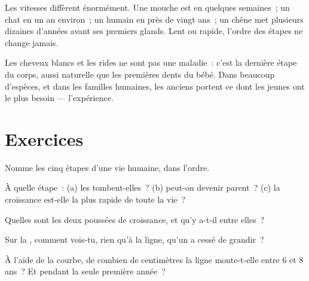 \begin{example}\label{ex:g3:stages-of-life:speeds}
Les vitesses diffèrent énormément. Une mouche est  en quelques
semaines~; un chat en un an environ~; un humain en près de vingt
ans~; un chêne met plusieurs dizaines d'années avant ses premiers
glands. Lent ou rapide, l'ordre des étapes ne change jamais.
\end{example}

\begin{remark}\label{rem:g3:stages-of-life:oldage}
Les cheveux blancs et les rides ne sont pas une maladie~: c'est la
dernière étape du corps, aussi naturelle que les premières dents du
bébé. Dans beaucoup d'espèces, et dans les familles humaines, les
anciens portent ce dont les jeunes ont le plus besoin ---
l'expérience.
\end{remark}

\section{Exercices}

\begin{exercise}[$\star$]\label{exo:g3:stages-of-life:1}
Nomme les cinq étapes d'une vie humaine, dans l'ordre.
\end{exercise}

\begin{exercise}[$\star$]\label{exo:g3:stages-of-life:2}
À quelle étape~: (a) les  tombent-elles~? (b) peut-on
devenir parent~? (c) la croissance est-elle la plus rapide de toute
la vie~?
\end{exercise}

\begin{exercise}[$\star$]\label{exo:g3:stages-of-life:3}
Quelles sont les deux poussées de croissance, et qu'y a-t-il entre
elles~?
\end{exercise}

\begin{exercise}[$\star$]\label{exo:g3:stages-of-life:4}
Sur la , comment vois-tu, rien qu'à la ligne,
qu'un  a cessé de grandir~?
\end{exercise}

\begin{exercise}[$\star$]\label{exo:g3:stages-of-life:5}
À l'aide de la courbe, de combien de centimètres la ligne monte-t-elle
entre $6$ et $8$ ans~? Et pendant la seule première année~?
\end{exercise}

